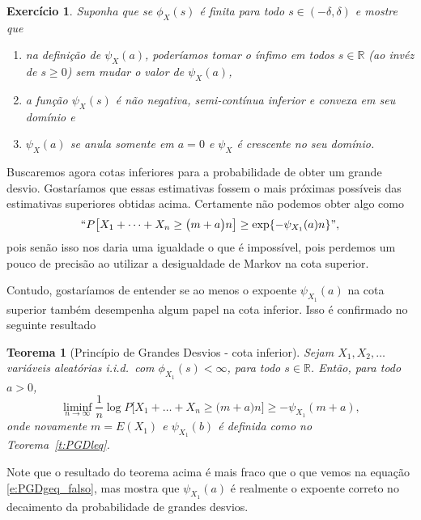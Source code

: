 \documentclass[reqno, draft]{book}
\newcommand*\1{\mathds{1}}
\newtheorem{theorem}{Teorema}[section]
\newtheorem{exercise}[example]{Exercício}
\def \iid{i.i.d.~}
\begin{document}

\begin{exercise}
  Suponha que se $\phi_{X}(s)$ é finita para todo $s \in (-\delta, \delta)$ e mostre que
  \begin{enumerate}[\quad a)]
  \item na definição de $\psi_{X}(a)$, poderíamos tomar o ínfimo em todos $s \in \mathbb{R}$ (ao invéz de $s \geq 0$) sem mudar o valor de $\psi_X(a)$,
  \item a função $\psi_{X}(s)$ é não negativa, semi-contínua inferior e convexa em seu domínio e
  \item $\psi_X(a)$ se anula somente em $a = 0$ e $\psi_X$ é crescente no seu domínio.
  \end{enumerate}
\end{exercise}

Buscaremos agora cotas inferiores para a probabilidade de obter um grande desvio.
Gostaríamos que essas estimativas fossem o mais próximas possíveis das estimativas superiores obtidas acima.
Certamente não podemos obter algo como
\begin{equation}
  \label{e:PGDgeq_falso}
  `` P\big[ X_1 + \dots + X_n \geq \big(m + a \big) n \big] \geq \exp\{-\psi_{X_1}(a) n\} ",
\end{equation}
pois senão isso nos daria uma igualdade o que é impossível, pois perdemos um pouco de precisão ao utilizar a desigualdade de Markov na cota superior.

Contudo, gostaríamos de entender se ao menos o expoente $\psi_{X_1}(a)$ na cota superior também desempenha algum papel na cota inferior.
Isso é confirmado no seguinte resultado

\begin{theorem}[Princípio de Grandes Desvios - cota inferior]
  \label{t:PGDgeq}
  Sejam $X_1, X_2, \dots$ variáveis aleatórias \iid com $\phi_{X_1}(s) < \infty$, para todo $s \in \mathbb{R}$.
  Então, para todo $a > 0$,
  \begin{equation}
    \liminf_{n \to \infty} \frac{1}{n} \log P\big[ X_1 + \dots + X_n \geq \big(m + a \big) n \big] \geq -\psi_{X_1}(m + a),
  \end{equation}
  onde novamente $m = E(X_1)$ e $\psi_{X_1}(b)$ é definida como no Teorema~\ref{t:PGDleq}.
\end{theorem}

Note que o resultado do teorema acima é mais fraco que o que vemos na equação \eqref{e:PGDgeq_falso}, mas mostra que $\psi_{X_1}(a)$ é realmente o expoente correto no decaimento da probabilidade de grandes desvios.
\end{document}
